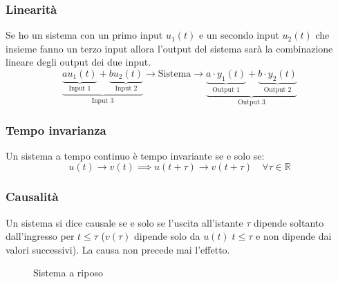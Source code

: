 \documentclass[a4paper]{article}
\begin{document}
\subsubsection{Linearità}
Se ho un sistema con un primo input \( u_1(t) \) e un secondo input \( u_2(t) \) che
insieme fanno un terzo input allora l'output del sistema sarà la combinazione lineare
degli output dei due input.
\[
  \underbrace{\underbrace{au_1(t)}_{\text{Input 1}} + \underbrace{bu_2(t)}_{\text{Input 2}}}_{\text{Input 3}}
  \to \text{Sistema} \to \underbrace{\underbrace{a \cdot y_1(t)}_{\text{Output 1}} + \underbrace{b \cdot y_2(t)}_{\text{Output 2}}}_{\text{Output 3}}
\] 

\subsubsection{Tempo invarianza}
Un sistema a tempo continuo è tempo invariante se e solo se:
\[
  u(t) \to v(t) \implies u(t+\tau) \to  v(t+\tau) \quad \forall \tau \in \mathbb{R}
\] 

\subsubsection{Causalità}
Un sistema si dice causale se e solo se l'uscita all'istante \( \tau \) dipende soltanto
dall'ingresso per \( t \le \tau \) (\( v(\tau) \) dipende solo da \( u(t) \; t \le \tau \)
e non dipende dai valori successivi). La causa non precede mai l'effetto.
\begin{figure}[H]
  \centering
  \caption{Sistema a riposo}
\end{figure}
\end{document}
